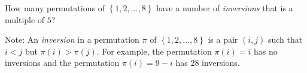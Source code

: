 How many permutations of $\left\{1,2,\ldots,8\right\}$ have a number of \emph{inversions} that is a multiple of $5$?
	
	Note: An \emph{inversion} in a permutation $\pi$ of $\left\{1,2,\ldots,8\right\}$ is a pair $\left(i,j\right)$ such that $i<j$ but $\pi\left(i\right)>\pi\left(j\right)$. For example, the permutation $\pi\left(i\right)=i$ has no inversions and the permutation $\pi\left(i\right)=9-i$ has $28$ inversions.